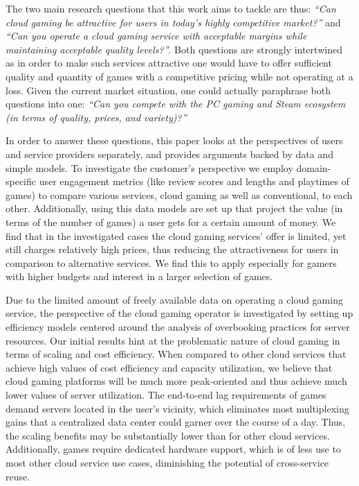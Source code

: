 The two main research questions that this work aims to tackle are thus:
\textit{``Can cloud gaming be attractive for users in today's highly
competitive market?''} and \textit{``Can you operate a cloud gaming
service with acceptable margins while maintaining acceptable quality
levels?''}. Both questions are strongly intertwined as in order to make
such services attractive one would have to offer sufficient quality and
quantity of games with a competitive pricing while not operating at a
loss. Given the current market situation, one could actually paraphrase
both questions into one: \textit{``Can you compete with the PC gaming
and Steam ecosystem (in terms of quality, prices, and variety)?''}

In order to answer these questions, this paper looks at the perspectives
of users and service providers separately, and provides arguments backed
by data and simple models. To investigate the customer's perspective we
employ domain-specific user engagement metrics (like review scores and
lengths and playtimes of games) to compare various services, cloud
gaming as well as conventional, to each other. Additionally, using this
data models are set up that project the value (in terms of the number of
games) a user gets for a certain amount of money. We find that in the
investigated cases the cloud gaming services' offer is limited, yet
still charges relatively high prices, thus reducing the attractiveness
for users in comparison to alternative services. We find this to apply
especially for gamers with higher budgets and interest in a larger
selection of games.

Due to the limited amount of freely available data on operating a cloud
gaming service, the perspective of the cloud gaming operator is
investigated by setting up efficiency models centered around the
analysis of overbooking practices for server resources. Our initial
results hint at the problematic nature of cloud gaming in terms of
scaling and cost efficiency. When compared to other cloud services that
achieve high values of cost efficiency and capacity utilization, we
believe that cloud gaming platforms will be much more peak-oriented and
thus achieve much lower values of server utilization. The end-to-end lag
requirements of games demand servers located in the user's vicinity,
which eliminates most multiplexing gains that a centralized data center
could garner over the course of a day. Thus, the scaling benefits may be
substantially lower than for other cloud services. Additionally, games
require dedicated hardware support, which is of less use to most other
cloud service use cases, diminishing the potential of cross-service
reuse.

